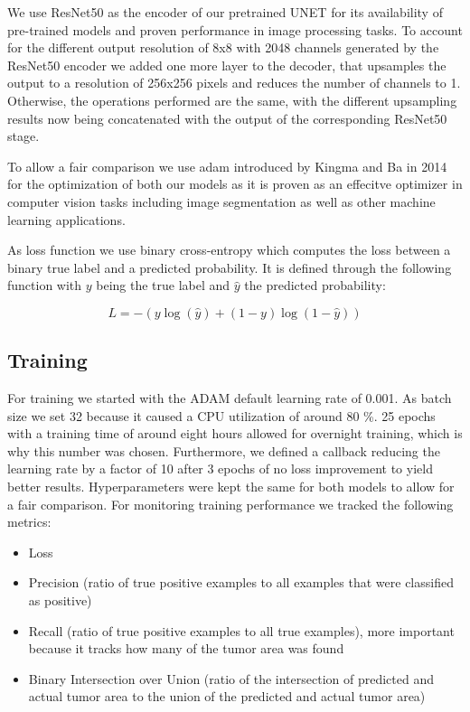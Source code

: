 \documentclass[lettersize,journal]{IEEEtran}
\begin{document}
We use ResNet50 \cite{he2015deepresiduallearningimage} as the encoder of our pretrained UNET for its availability of pre-trained models and proven performance in image processing tasks. To account for the different output resolution of 8x8 with 2048 channels generated by the ResNet50 encoder we added one more layer to the decoder, that upsamples the output to a resolution of 256x256 pixels and reduces the number of channels to 1. Otherwise, the operations performed are the same, with the different upsampling results now being concatenated with the output of the corresponding ResNet50 stage.

To allow a fair comparison we use \gls{adam} introduced by Kingma and Ba in 2014 \cite{kingma2017adammethodstochasticoptimization} for the optimization of both our models as it is proven as an effecitve optimizer in computer vision tasks including image segmentation as well as other machine learning applications. 

As loss function we use binary cross-entropy which computes the loss between a binary true label and a predicted probability. It is defined through the following function with \( y \) being the true label and \( \hat{y} \) the predicted probability:

\begin{equation}
{L} = - \left( y \log(\hat{y}) + (1 - y) \log(1 - \hat{y}) \right)
\end{equation}

\subsection{Training}
For training we started with the ADAM default learning rate of 0.001. As batch size we set 32 because it caused a CPU utilization of around 80 \%. 25 epochs with a training time of around eight hours allowed for overnight training, which is why this number was chosen. Furthermore, we defined a callback reducing the learning rate by a factor of 10 after 3 epochs of no loss improvement to yield better results. Hyperparameters were kept the same for both models to allow for a fair comparison. For monitoring training performance we tracked the following metrics:

\begin{itemize}
  \item Loss
  \item Precision (ratio of true positive examples to all examples that were classified as positive)
  \item Recall (ratio of true positive examples to all true examples), more important because it tracks how many of the tumor area was found
  \item Binary Intersection over Union (ratio of the intersection of predicted and actual tumor area to the union of the predicted and actual tumor area)
\end{itemize}
\end{document}
